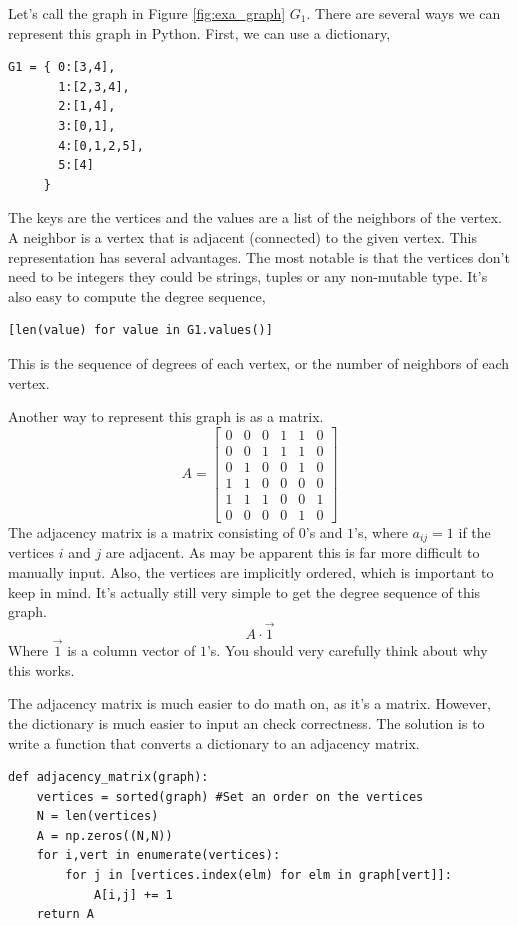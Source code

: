 \documentclass[11pt,letterpaper]{article}
\begin{document}
Let's call the graph in Figure \ref{fig:exa_graph} $G_1$. There are several ways we can represent this
graph in Python. First, we can use a dictionary,
\begin{verbatim}
G1 = { 0:[3,4],
       1:[2,3,4],
       2:[1,4],
       3:[0,1],
       4:[0,1,2,5],
       5:[4]
     }
\end{verbatim}
The keys are the vertices and the values are a list of the neighbors of the vertex. A neighbor is a
vertex that is adjacent (connected) to the given vertex. This representation has several advantages. 
The most notable is that the vertices don't need to be integers they could be strings, tuples
or any non-mutable type. It's also easy to compute the degree sequence,
\begin{verbatim}
[len(value) for value in G1.values()]
\end{verbatim}
This is the sequence of degrees of each vertex, or the number of neighbors of each vertex.


Another way to represent this graph is as a matrix. 
\begin{equation*}
 A = \begin{bmatrix}
0 & 0 & 0 & 1 & 1 & 0  \\
0 & 0 & 1 & 1 & 1 & 0  \\
0 & 1 & 0 & 0 & 1 & 0  \\
1 & 1 & 0 & 0 & 0 & 0  \\
1 & 1 & 1 & 0 & 0 & 1  \\
0 & 0 & 0 & 0 & 1 & 0 
\end{bmatrix}
\end{equation*}
The adjacency matrix is a matrix consisting of $0$'s and $1$'s, where $a_{ij}=1$ if the vertices
$i$ and $j$ are adjacent. As may be apparent this is far more difficult to manually input. Also, the
vertices are implicitly ordered, which is important to keep in mind. It's actually still very simple
to get the degree sequence of this graph.
\[
A\cdot\vec{1}
\]
Where $\vec{1}$ is a column vector of $1$'s. You should very carefully think about why this works.

The adjacency matrix is much easier to do math on, as it's a matrix. However, the dictionary is much
easier to input an check correctness. The solution is to write a function that converts a dictionary
to an adjacency matrix. 

\begin{verbatim}
def adjacency_matrix(graph):
    vertices = sorted(graph) #Set an order on the vertices
    N = len(vertices)
    A = np.zeros((N,N))
    for i,vert in enumerate(vertices):
        for j in [vertices.index(elm) for elm in graph[vert]]:
            A[i,j] += 1
    return A    
\end{verbatim}
\end{document}
